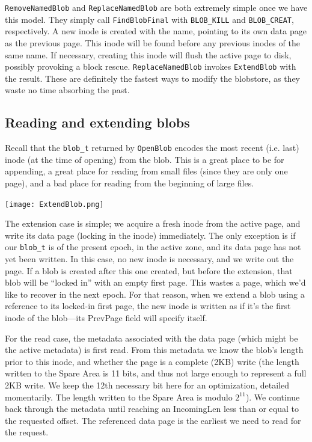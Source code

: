 \documentclass[letterpaper,10pt]{article}
\begin{document}
\texttt{RemoveNamedBlob} and \texttt{ReplaceNamedBlob} are both extremely
simple once we have this model. They simply call \texttt{FindBlobFinal} with
\texttt{BLOB\_KILL} and \texttt{BLOB\_CREAT}, respectively. A new inode is
created with the name, pointing to its own data page as the previous page.
This inode will be found before any previous inodes of the same name. If
necessary, creating this inode will flush the active page to disk, possibly
provoking a block rescue. \texttt{ReplaceNamedBlob} invokes \texttt{ExtendBlob}
with the result. These are definitely the fastest ways to modify the blobstore,
as they waste no time absorbing the past.

\subsection{Reading and extending blobs}
Recall that the \texttt{blob\_t} returned by \texttt{OpenBlob} encodes the most
recent (i.e. last) inode (at the time of opening) from the blob. This is a
great place to be for appending, a great place for reading from small files
(since they are only one page), and a bad place for reading from the beginning
of large files.

\begin{minipage}{\textwidth}
\begin{center}
\texttt{[image: ExtendBlob.png]}
\end{center}
\end{minipage}

The extension case is simple; we acquire a fresh inode from the
active page, and write its data page (locking in the inode) immediately. The
only exception is if our \texttt{blob\_t} is of the present epoch, in the
active zone, and its data page has not yet been written. In this case, no new
inode is necessary, and we write out the page. If a blob is created after this
one created, but before the extension, that blob will be ``locked in'' with an
empty first page. This wastes a page, which we'd like to recover in the next
epoch. For that reason, when we extend a blob using a reference to its locked-in
first page, the new inode is written as if it's the first inode of the blob---its
PrevPage field will specify itself.

For the read case, the metadata associated with the data
page (which might be the active metadata) is first read. From this metadata we
know the blob's length prior to this inode, and whether the page is a complete
(2KB) write (the length written to the Spare Area is 11 bits, and thus not
large enough to represent a full 2KB write. We keep the 12th necessary bit here
for an optimization, detailed momentarily. The length written to the Spare Area
is modulo $2^{11}$). We continue back through the metadata until reaching an
IncomingLen less than or equal to the requested offset. The referenced data
page is the earliest we need to read for the request.
\end{document}
